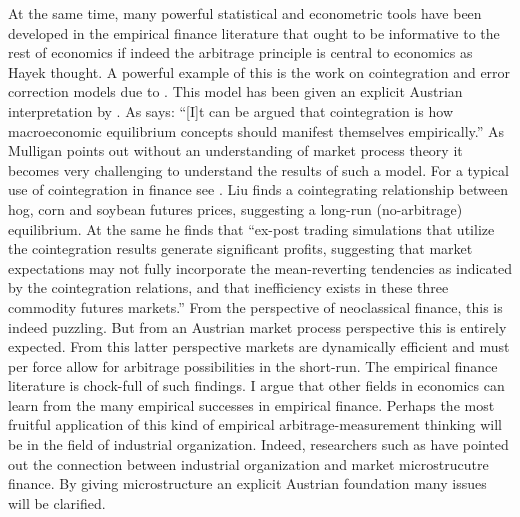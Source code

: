 \documentclass[11pt,]{article}
\begin{document}
At the same time, many powerful statistical and econometric tools have
been developed in the empirical finance literature that ought to be
informative to the rest of economics if indeed the arbitrage principle
is central to economics as Hayek thought. A powerful example of this is
the work on cointegration and error correction models due to
\citet{EngleGranger1987}. This model has been given an explicit Austrian
interpretation by \citet{Mulligan2005}. As \citet{Koop2006} says:
``{[}I{]}t can be argued that cointegration is how macroeconomic
equilibrium concepts should manifest themselves empirically.'' As
Mulligan points out without an understanding of market process theory it
becomes very challenging to understand the results of such a model. For
a typical use of cointegration in finance see \citet{Liu2005}. Liu finds
a cointegrating relationship between hog, corn and soybean futures
prices, suggesting a long-run (no-arbitrage) equilibrium. At the same he
finds that ``ex-post trading simulations that utilize the cointegration
results generate significant profits, suggesting that market
expectations may not fully incorporate the mean-reverting tendencies as
indicated by the cointegration relations, and that inefficiency exists
in these three commodity futures markets.'' From the perspective of
neoclassical finance, this is indeed puzzling. But from an Austrian
market process perspective this is entirely expected. From this latter
perspective markets are dynamically efficient and must per force allow
for arbitrage possibilities in the short-run. The empirical finance
literature is chock-full of such findings. I argue that other fields in
economics can learn from the many empirical successes in empirical
finance. Perhaps the most fruitful application of this kind of empirical
arbitrage-measurement thinking will be in the field of industrial
organization. Indeed, researchers such as \citet{Spulber1999} have
pointed out the connection between industrial organization and market
microstrucutre finance. By giving microstructure an explicit Austrian
foundation many issues will be clarified.
\end{document}
